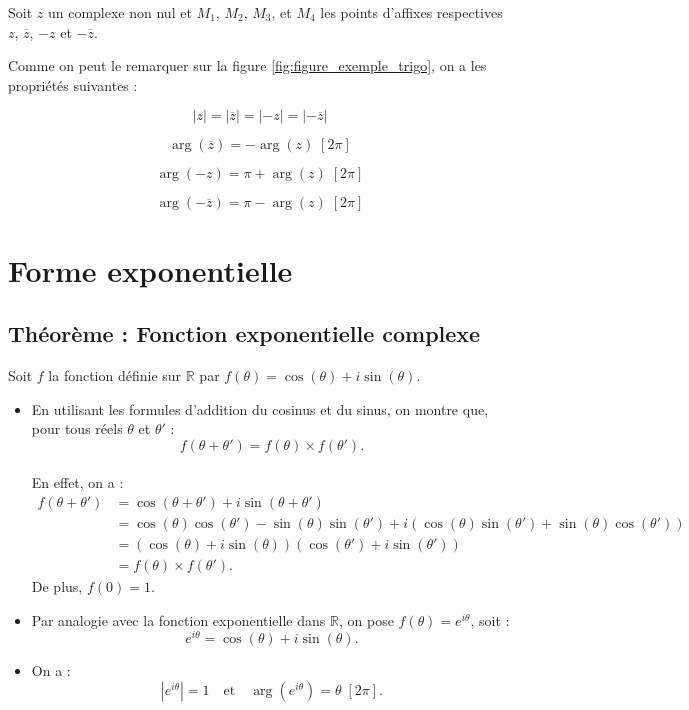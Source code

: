 \documentclass[a4paper,12pt]{article}
\begin{document}
    Soit $z$ un complexe non nul et $M_1$, $M_2$, $M_3$, et $M_4$ les points d’affixes respectives $z$, $\overline{z}$, $-z$ et $-\overline{z}$.

    Comme on peut le remarquer sur la figure \ref{fig:figure_exemple_trigo}, on a les propriétés suivantes :

    \[
        |z| = |\overline{z}| = |{-z}| = |{-\overline{z}}|
    \]

    \[
        \arg(\overline{z}) = -\arg(z) \; [2\pi]
    \]

    \[
        \arg(-z) = \pi + \arg(z) \; [2\pi]
    \]

    \[
        \arg(-\overline{z}) = \pi - \arg(z) \; [2\pi]
    \]

    \section{Forme exponentielle}

    \subsection{Théorème : Fonction exponentielle complexe}

    Soit $f$ la fonction définie sur $\mathbb{R}$ par $f(\theta) = \cos(\theta) + i\sin(\theta)$.

    \begin{itemize}
        \item En utilisant les formules d’addition du cosinus et du sinus, on montre que, pour tous réels $\theta$ et $\theta'$ :
        \[
            f(\theta + \theta') = f(\theta) \times f(\theta').
        \] \\
        En effet, on a : \\
        \begin{align*}
            f(\theta + \theta') &= \cos(\theta + \theta') + i\sin(\theta + \theta') \\
            &= \cos(\theta)\cos(\theta') - \sin(\theta)\sin(\theta') + i(\cos(\theta)\sin(\theta') + \sin(\theta)\cos(\theta')) \\
            &= (\cos(\theta) + i\sin(\theta))(\cos(\theta') + i\sin(\theta')) \\
            &= f(\theta) \times f(\theta').
        \end{align*}
        De plus, $f(0) = 1$.
        \item Par analogie avec la fonction exponentielle dans $\mathbb{R}$, on pose $f(\theta) = e^{i\theta}$, soit :
        \[
            e^{i\theta} = \cos(\theta) + i\sin(\theta).
        \]
        \item On a :
        \[
            |e^{i\theta}| = 1 \quad \text{et} \quad \arg(e^{i\theta}) = \theta \; [2\pi].
        \]
    \end{itemize}
\end{document}
